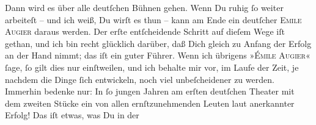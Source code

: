               Dann wird {\pb}es über alle deutſchen Bühnen gehen. Wenn Du ruhig{ }ſo
               weiter arbeiteſt – und ich weiß, Du wirſt es thun – kann am Ende ein deutſcher \textsc{Emile Augier} daraus werden. Der erſte entſcheidende Schritt auf dieſem Wege iſt gethan, und
               ich bin recht glücklich darüber, daß Dich gleich zu Anfang der Erfolg \strikeout{\textcolor{gray}{in die Hand}} an der Hand nimmt; das iſt ein guter Führer. Wenn ich übrigens »\textsc{Émile Augier}«{ }ſage,{ }ſo gilt dies nur einſtweilen, und ich behalte mir vor, im Laufe der
               Zeit, je nachdem die Dinge{ }ſich entwickeln, {\pb}noch
               viel unbeſcheidener zu werden. Immerhin bedenke nur: In{ }ſo jungen Jahren am erſten
               deutſchen Theater mit dem
               zweiten Stücke ein von allen
                   ernſtzunehmenden Leuten laut anerkannter Erfolg! Das iſt etwas, was Du in der
